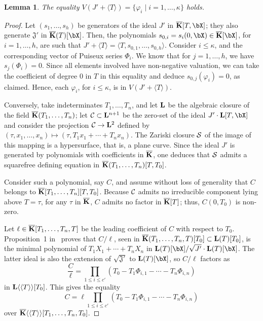 \documentclass[12pt]{article}
\newtheorem{lemma}[definition]{Lemma}
\begin{document}
\begin{lemma}\label{lemma:Z1}
  The equality $V(J' +\langle T \rangle)=\{\varphi_i \mid i=1,\dots,\kappa\}$ holds.
\end{lemma}
\begin{proof}
  Let $(s_1,\dots,s_h)$ be generators  of the ideal $J'$ in $\KKbar[T,\bX]$;
  they also generate $\mathfrak{J}'$ in
  $\KKbar(T)[\bX]$. Then, the polynomials $s_{0,i}=s_i(0,\bX) \in \KKbar[\bX]$,
  for $i=1,\dots,h$, are such that $J'+\langle T\rangle = \langle
  T,s_{0,1},\dots,s_{0,h} \rangle$.  Consider $i \le \kappa$, and the
  corresponding vector of Puiseux series $\Phi_i$. We know that for
  $j=1,\dots,h$, we have $s_j(\Phi_i)=0$.  Since all elements involved
  have non-negative valuation, we can take the coefficient of degree
  $0$ in $T$ in this equality and deduce $s_{0,j}(\varphi_i)=0$, as
  claimed. Hence, each $\varphi_i$, for $i \le \kappa$, is in $V(J' +
  \langle T \rangle)$.

  Conversely, take indeterminates $T_1,\dots,T_n$, and let $\mathbf{L}$ be
  the algebraic closure of the field $\overline{\mathbf{K}}(T_1,\dots,T_n)$; let
  ${\cal C}\subset{\ensuremath{\mathbf{L}}}{}^{n+1}$ be the zero-set of the ideal $J'\cdot
  \LL[T,\bX]$ and consider the projection ${\cal C} \to {\ensuremath{\mathbf{L}}}{}^2$
  defined by $(\tau,x_1,\dots,x_n)\mapsto (\tau,T_1 x_1 + \cdots + T_n
  x_n)$. The Zariski closure ${\cal S}$ of the image of this mapping
  is a hypersurface, that is, a plane curve.  Since the ideal $J'$ is generated by polynomials
  with coefficients in $\overline{\mathbf{K}}$, one deduces that ${\cal S}$ admits a squarefree
  defining equation in $\overline{\mathbf{K}}(T_1,\dots,T_n)[T,T_0]$.

  Consider such a polynomial, say $C$, and assume without loss of
  generality that $C$ belongs to 
  $\overline{\mathbf{K}}[T_1,\dots,T_n][T,T_0]$. Because ${\cal C}$ admits no irreducible
  component lying above $T=\tau$, for any $\tau$ in $\overline{\mathbf{K}}$, $C$
  admits no factor in $\overline{\mathbf{K}}[T]$; thus, $C(0,T_0)$ is non-zero.

  Let $\ell \in \overline{\mathbf{K}}[T_1,\dots,T_n,T]$ be the leading coefficient of
  $C$ with respect to $T_0$. Proposition~1 in~\cite{Schost03} proves
  that $C/\ell$, seen in $\overline{\mathbf{K}}(T_1,\dots,T_n,T)[T_0] \subset
  \mathbf{L}(T)[T_0]$, is the minimal polynomial of $T_1 X_1 + \cdots +
  T_n X_n$ in $\LL(T)[\bX]/\sqrt{J'}\cdot \LL(T)[\bX]$. The latter ideal
  is also the extension of $\sqrt{\mathfrak{J}'}$ to $\LL(T)[\bX]$, 
  so $C/\ell$ factors as
  $$\frac C\ell = \prod_{1\le i \le c'}(T_0-T_1 \Phi_{i,1} - \cdots - T_n \Phi_{i,n})$$
  in $\mathbf{L}\langle\langle T \rangle\rangle[T_0]$.
  This gives the equality 
  $$C =\ell \prod_{1\le i \le  c'}(T_0-T_1 \Phi_{i,1} - \cdots - T_n
  \Phi_{i,n})$$ over $\overline{\mathbf{K}}\langle\langle T \rangle\rangle[T_1,\dots,T_n,T_0]$. 


\end{proof}
\end{document}
